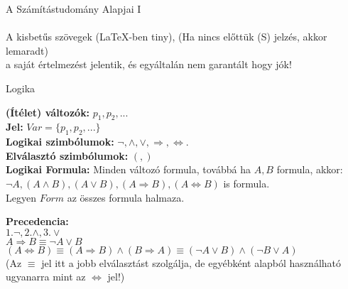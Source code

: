 \documentclass{beamer}
\newcommand{\mmedskip}{\vspace{0.5em}}
\newcommand{\mbigskip}{\vspace{1em}}
\begin{document}
\begin{frame}[plain]
\begin{tcolorbox}[center, colback={myyellow}, coltext={black}, colframe={myyellow}]
{\Huge A Számítástudomány Alapjai I}\\
\mbigskip
\\
A kisbetűs szövegek (LaTeX-ben tiny), (Ha nincs előttük (S) jelzés, akkor lemaradt)\\
a saját értelmezést jelentik, és egyáltalán nem garantált hogy jók!
\end{tcolorbox}
\end{frame}


\begin{frame}[plain]
\begin{tcolorbox}[center, colback={myyellow}, coltext={black}, colframe={myyellow}]
    {\Huge Logika}
    \mmedskip
\end{tcolorbox}
\end{frame}

\begin{frame}

\begin{tcolorbox}[squeezed title={(Ítélet) változók, Logikai szimbólumok, Elválasztó szimbólumok, Logikai formula}]
\mbigskip
\textbf{(Ítélet) változók:} $p_1, p_2, ...$\\
\hspace{1ex} \textbf{Jel: } $Var = \{p_1, p_2, ...\}$\\
\mbigskip
\textbf{Logikai szimbólumok:} ${\neg}, {\land}, {\lor}, {\Rightarrow}, {\iff}.$\\
\mbigskip
\textbf{Elválasztó szimbólumok:} $(, )$\\
\mbigskip
\textbf{Logikai Formula:} Minden változó formula, továbbá ha $A, B$ formula, akkor:\\
\textbf{${\neg}A, (A \land B), (A \lor B), (A \Rightarrow B), (A \iff B)$} is formula.\\
\mbigskip
Legyen $Form$ az összes formula halmaza.
\end{tcolorbox}

\begin{tcolorbox}[title={Megj}]
\textbf{Precedencia:}\\ 
\mbigskip
$1. {\neg}, 2. {\land}, 3. {\lor}$\\
\mbigskip
$A \Rightarrow B \equiv {\neg}A \lor B$\\
$(A \iff B) \equiv (A \Rightarrow B) \land (B \Rightarrow A) \equiv ({\neg}A \lor B) \land ({\neg}B \lor A)$\\
\mbigskip
(Az $\equiv$ jel itt a jobb elválasztást szolgálja, de egyébként alapból használható ugyanarra mint az $\iff$ jel!)
\end{tcolorbox}
\end{frame}
\end{document}
